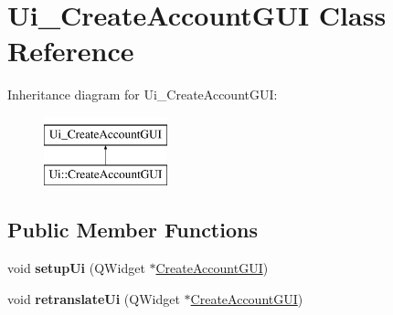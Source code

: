 \hypertarget{classUi__CreateAccountGUI}{}\section{Ui\+\_\+\+Create\+Account\+G\+UI Class Reference}
\label{classUi__CreateAccountGUI}
Inheritance diagram for Ui\+\_\+\+Create\+Account\+G\+UI\+:\begin{figure}[H]
\begin{center}
\leavevmode
\includegraphics[height=2.000000cm]{classUi__CreateAccountGUI}
\end{center}
\end{figure}
\subsection*{Public Member Functions}
\begin{DoxyCompactItemize}
\item 
void {\bfseries setup\+Ui} (Q\+Widget $\ast$\hyperlink{classCreateAccountGUI}{Create\+Account\+G\+UI})\hypertarget{classUi__CreateAccountGUI_a2372fdbbfcfb06c67f7a884ed264449c}{}\label{classUi__CreateAccountGUI_a2372fdbbfcfb06c67f7a884ed264449c}

\item 
void {\bfseries retranslate\+Ui} (Q\+Widget $\ast$\hyperlink{classCreateAccountGUI}{Create\+Account\+G\+UI})\hypertarget{classUi__CreateAccountGUI_a060873fe4a16299b8e45f513b74cdfe8}{}\label{classUi__CreateAccountGUI_a060873fe4a16299b8e45f513b74cdfe8}

\end{DoxyCompactItemize}
